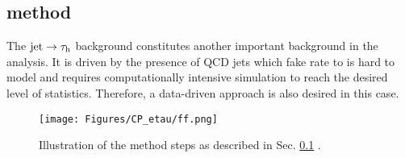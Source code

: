 \subsection{\ff method}\label{sec:ff}
The $\text{jet} \to \tau_\mathrm{h}$ background constitutes another important background in the analysis. It is driven by the presence of QCD jets which fake rate to \tauh is hard to model and requires computationally intensive simulation to reach the desired level of statistics. Therefore, a data-driven approach is also desired in this case.

\begin{figure}[t!]
    \centering
    \texttt{[image: Figures/CP\_etau/ff.png]}
    \caption{Illustration of the \ff method steps as described in Sec. \ref{sec:ff} \cite{CMS:2018rmh}.}
    \label{fig:ff}
\end{figure}

